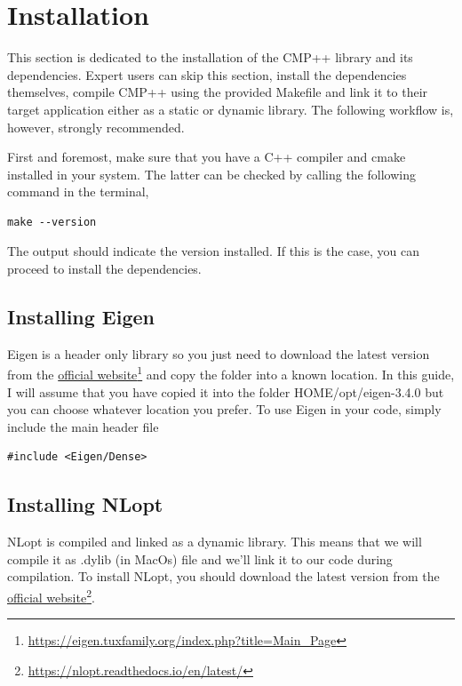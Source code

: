 \documentclass{ol-softwaremanual}
\newcommand{\doclink}[2]{\href{#1}{#2}\footnote{\url{#1}}}
\begin{document}
\section{Installation}

This section is dedicated to the installation of the CMP++ library and its dependencies. Expert users can skip this section, install the dependencies themselves, compile CMP++ using the provided Makefile and link it to their target application either as a static or dynamic library. The following workflow is, however, strongly recommended.

\smallskip
First and foremost, make sure that you have a C++ compiler and cmake installed in your system. The latter can be checked by calling the following command in the terminal,

\begin{listing}[H]
\begin{verbatim}
make --version
\end{verbatim}
\end{listing}

The output should indicate the version installed. If this is the case, you can proceed to install the dependencies.

\subsection{Installing Eigen}
Eigen is a header only library so you just need to download the latest version from the \doclink{https://eigen.tuxfamily.org/index.php?title=Main_Page}{official website} and copy the folder into a known location. In this guide, I will assume that you have copied it into the folder HOME/opt/eigen-3.4.0 but you can choose whatever location you prefer. To use Eigen in your code, simply include the main header file

\begin{listing}[H]
\begin{verbatim}
#include <Eigen/Dense>
\end{verbatim}
\end{listing}

\subsection{Installing NLopt}
NLopt is compiled and linked as a dynamic library. This means that we will compile it as .dylib (in MacOs) file and we'll link it to our code during compilation. To install NLopt, you should download the latest version from the \doclink{https://nlopt.readthedocs.io/en/latest/}{official website}.
\end{document}
